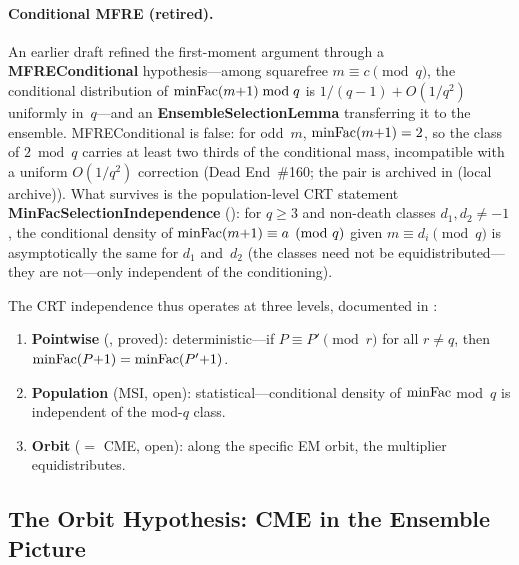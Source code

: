 \paragraph{Conditional MFRE (retired).}
An earlier draft refined the first-moment argument through a
\textbf{MFREConditional} hypothesis---among squarefree $m \equiv c
\pmod q$, the conditional distribution of $\mathrm{minFac}(m{+}1) \bmod q$ is
$1/(q{-}1) + O(1/q^2)$ uniformly in~$q$---and an
\textbf{EnsembleSelectionLemma} transferring it to the ensemble.
MFREConditional is false: for odd~$m$, $\mathrm{minFac}(m{+}1) = 2$, so the
class of $2 \bmod q$ carries at least two thirds of the conditional
mass, incompatible with a uniform $O(1/q^2)$ correction (Dead
End~\#160; the pair is archived in
 (local archive)).  What survives is the
population-level CRT statement
\textbf{MinFacSelectionIndependence}
(): for
$q \geq 3$ and non-death classes $d_1, d_2 \neq -1$, the conditional
density of $\mathrm{minFac}(m{+}1) \equiv a \pmod{q}$ given
$m \equiv d_i \pmod{q}$ is asymptotically the same for $d_1$ and~$d_2$
(the classes need not be equidistributed---they are not---only
independent of the conditioning).

The CRT independence thus operates at three levels, documented in
:
\begin{enumerate}[nosep]
\item \textbf{Pointwise} (, proved):
  deterministic---if $P \equiv P' \pmod{r}$ for all $r \neq q$, then
  $\mathrm{minFac}(P{+}1) = \mathrm{minFac}(P'{+}1)$.
\item \textbf{Population} (MSI, open): statistical---conditional
  density of $\mathrm{minFac}$ mod~$q$ is independent of the mod-$q$ class.
\item \textbf{Orbit} ($=$ CME, open): along the specific EM orbit,
  the multiplier equidistributes.
\end{enumerate}

\subsection{The Orbit Hypothesis: CME in the Ensemble Picture}
\label{sec:dsl-route}

